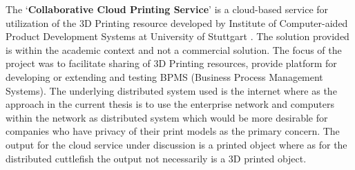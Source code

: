 The {\lq}\textbf{Collaborative Cloud Printing Service}{\rq} is a cloud-based service for utilization of the 3D Printing resource developed by Institute of Computer-aided Product Development Systems at University of Stuttgart \cite{Baumann2016}. The solution provided is within the academic context and not a commercial solution. The focus of the project was to facilitate sharing of 3D Printing resources, provide platform for developing or extending and testing BPMS (Business Process Management Systems). The underlying distributed system used is the internet where as the approach in the current thesis is to use the enterprise network and computers within the network as distributed system which would be more desirable for companies who have privacy of their print models as the primary concern. The output for the cloud service under discussion is a printed object where as for the distributed cuttlefish the output not necessarily is a 3D printed object.  


